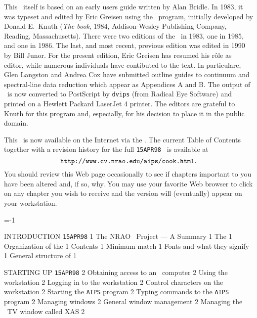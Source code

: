      This \COOKBOOK\ itself is based on an early users
guide written by Alan Bridle.  In 1983, it was typeset and edited by
Eric Greisen using the \TEX\ program, initially developed by Donald
E.~Knuth ({\it The \TEX book}, 1984, Addison-Wesley Publishing
Company, Reading, Massachusetts).  There were two editions of the
\COOKBOOK\ in 1983, one in 1985, and one in 1986.  The last, and most
recent, previous edition was edited in 1990 by Bill Junor.  For the
present edition, Eric Greisen has resumed his r\^ole as editor, while
numerous individuals have contibuted to the text.  In particulare,
Glen Langston and Andrea Cox have submitted outline guides to
continuum and spectral-line data reduction which appear as Appendices
A and \hbox{B}.  The output of \TEX\ is now converted to PostScript by
{\tt dvips} (from Radical Eye Software) and printed on a Hewlett
Packard LaserJet 4 printer.  The editors are grateful to Knuth for
this program and, especially, for his decision to place it in the
public domain.

{\lgpoint
This \Cookbook\ is now available on the Internet via the
.  The current Table of Contents together with a
revision history for the full {\tt 15APR98} \Cookbook\ is available at
$$ \hbox{{\tt http://www.cv.nrao.edu/aips/cook.html}.}$$ You
should review this Web page occasionally to see if chapters important
to you have been  altered and, if so, why.  You may use your favorite
Web browser to click on any chapter you wish to receive and the
 version will (eventually) appear on your
workstation.}

\def\titlea{15-OCT-1998 (revised 23-August-1998)}
=-1

     {INTRODUCTION%
}                     {{\tt 15APR98}\hskip 0.6cm 1}
   {The NRAO \AIPS\ Project --- A Summary}       {1}
   {The \COOKBOOK}                               {1}
   {Organization of the \COOKBOOK}               {1}
 {Contents}                                    {1}
 {Minimum match}                               {1}
 {Fonts and what they signify}                 {1}
   {General structure of \AIPS}                  {1}

     {STARTING UP \AIPS%
}                    {{\tt 15APR98}\hskip 0.6cm 2}
   {Obtaining access to an \AIPS\ computer}      {2}
   {Using the workstation}                       {2}
 {Logging in to the workstation}               {2}
 {Control characters on the workstation}       {2}
 {Starting the {\tt AIPS} program}             {2}
 {Typing commands to the {\tt AIPS} program}   {2}
   {Managing windows}                            {2}
 {General window management}                   {2}
 {Managing the \AIPS\ TV window called XAS}    {2}

